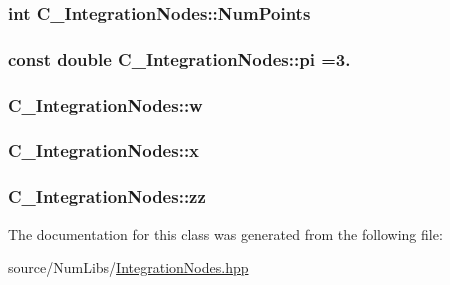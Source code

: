 \hypertarget{class_c___integration_nodes_a2aae6c2f677378b02fe1dd72137d5649}{
\subsubsection[{Num\-Points}]{\setlength{\rightskip}{0pt plus 5cm}int C\-\_\-\-Integration\-Nodes\-::\-Num\-Points\hspace{0.3cm}{\ttfamily [protected]}}}\label{class_c___integration_nodes_a2aae6c2f677378b02fe1dd72137d5649}
\hypertarget{class_c___integration_nodes_a2db6e5b500d59df584a1556fd2e928f4}{
\subsubsection[{pi}]{\setlength{\rightskip}{0pt plus 5cm}const double C\-\_\-\-Integration\-Nodes\-::pi =3.\hspace{0.3cm}{\ttfamily [protected]}}}\label{class_c___integration_nodes_a2db6e5b500d59df584a1556fd2e928f4}
\hypertarget{class_c___integration_nodes_a023a6f295be0574aca58f8a67ac6263d}{
\subsubsection[{w}]{ C\-\_\-\-Integration\-Nodes\-::w\hspace{0.3cm}{\ttfamily [protected]}}}\label{class_c___integration_nodes_a023a6f295be0574aca58f8a67ac6263d}
\hypertarget{class_c___integration_nodes_ac7482a184d19e0ec9bf62a99edd9e29b}{
\subsubsection[{x}]{ C\-\_\-\-Integration\-Nodes\-::x\hspace{0.3cm}{\ttfamily [protected]}}}\label{class_c___integration_nodes_ac7482a184d19e0ec9bf62a99edd9e29b}
\hypertarget{class_c___integration_nodes_abced67ac9650b49ca756fe34b0aa593a}{
\subsubsection[{zz}]{ C\-\_\-\-Integration\-Nodes\-::zz\hspace{0.3cm}{\ttfamily [protected]}}}\label{class_c___integration_nodes_abced67ac9650b49ca756fe34b0aa593a}


The documentation for this class was generated from the following file\-:\begin{DoxyCompactItemize}
\item 
source/\-Num\-Libs/\hyperlink{_integration_nodes_8hpp}{Integration\-Nodes.\-hpp}\end{DoxyCompactItemize}
